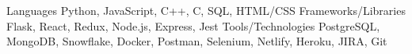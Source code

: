
\begin{cvskills}
  \cvskill
    {Languages} %
    {Python, JavaScript, C++, C, SQL, HTML/CSS} %
  \cvskill
    {Frameworks/Libraries} %
    {Flask, React, Redux, Node.js, Express, Jest} %
  \cvskill
    {Tools/Technologies} %
    {PostgreSQL, MongoDB, Snowflake, Docker, Postman, Selenium, Netlify, Heroku, JIRA, Git} %
\end{cvskills}
